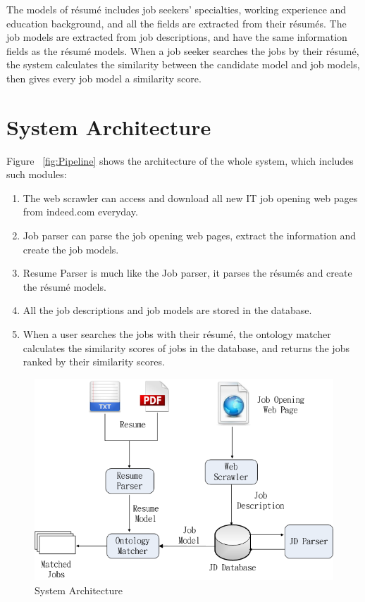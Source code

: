 The models of r\'esum\'e includes job seekers' specialties, working experience and education background, and all the fields are extracted from their r\'esum\'es. The job models are extracted from job descriptions, and have the same information fields as the r\'esum\'e models.  When a job seeker searches the jobs by their r\'esum\'e, the system calculates the similarity between the candidate model and job models, then gives every job model a similarity score.

\section{System Architecture}

Figure ~\ref{fig:Pipeline} shows the architecture of the whole system, which includes such modules:

\begin{enumerate}
    \item The web scrawler can access and download all new IT job opening web pages from indeed.com everyday.
    \item Job parser can parse the job opening web pages, extract the information and create the job models.
    \item Resume Parser is much like the Job parser, it parses the r\'esum\'es and create the r\'esum\'e models.
    \item All the job descriptions and job models are stored in the database.
    \item When a user searches  the jobs with their r\'esum\'e, the ontology matcher calculates the similarity scores of jobs in the database, and returns the jobs ranked by their similarity scores.
\end{enumerate}

\begin{figure}[htbp]
  \centering
  \includegraphics[scale=0.5]{images/arch.png}
  \caption{System Architecture}
  \label{fig:arch}
\end{figure}

